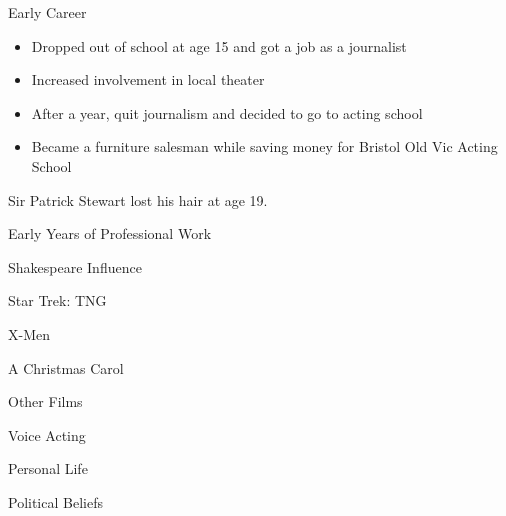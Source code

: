 \documentclass[xcolor=dvipsnames]{beamer}
\begin{document}
\begin{frame}{Early Career}
  \begin{itemize}
    \item Dropped out of school at age 15 and got a job as a journalist
    \item Increased involvement in local theater
    \item After a year, quit journalism and decided to go to acting school
    \item Became a furniture salesman while saving money for Bristol Old Vic
    Acting School
  \end{itemize}
  \begin{fct}
    Sir Patrick Stewart lost his hair at age 19.
  \end{fct}
\end{frame}

\begin{frame}{Early Years of Professional Work}

\end{frame}

\begin{frame}{Shakespeare Influence}

\end{frame}

\begin{frame}{Star Trek: TNG}

\end{frame}

\begin{frame}{X-Men}

\end{frame}

\begin{frame}{A Christmas Carol}

\end{frame}

\begin{frame}{Other Films}

\end{frame}

\begin{frame}{Voice Acting}

\end{frame}

\begin{frame}{Personal Life}

\end{frame}

\begin{frame}{Political Beliefs}

\end{frame}
\end{document}
